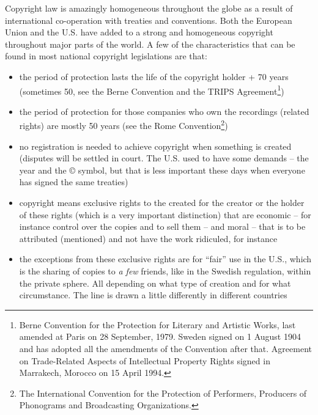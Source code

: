 Copyright law is amazingly homogeneous throughout the globe as a result of
international co-operation with treaties and conventions. Both the European
Union and the U.S. have added to a strong and homogeneous copyright throughout
major parts of the world. A few of the characteristics that can be found in most
national copyright legislations are that:
\begin{itemize}
    \item{the period of protection lasts the life of the copyright holder + 70
        years (sometimes 50, see the Berne Convention and the TRIPS
        Agreement\footnote{Berne Convention for the Protection for Literary and
        Artistic Works, last amended at Paris on 28 September, 1979. Sweden
        signed on 1 August 1904 and has adopted all the amendments of the
        Convention after that. Agreement on Trade-Related Aspects of
        Intellectual Property Rights signed in Marrakech, Morocco on 15 April
        1994.})}
    \item{the period of protection for those companies who own the recordings
        (related rights) are mostly 50 years (see the Rome
        Convention\footnote{The International Convention for the Protection of
        Performers, Producers of Phonograms and Broadcasting Organizations.})}
    \item{no registration is needed to achieve copyright when something is
        created (disputes will be settled in court. The U.S. used to have some
        demands – the year and the \copyright{} symbol, but that is less
        important these days when everyone has signed the same treaties)}
    \item{copyright means exclusive rights to the created for the creator or the
        holder of these rights (which is a very important distinction) that are
        economic – for instance control over the copies and to sell them – and
        moral – that is to be attributed (mentioned) and not have the work
        ridiculed, for instance}
    \item{the exceptions from these exclusive rights are for ``fair'' use in the
        U.S., which is the sharing of copies to \textit{a few} friends, like in
        the Swedish regulation, within the private sphere. All depending on what
        type of creation and for what circumstance. The line is drawn a little
        dif\hbox{}ferently in dif\hbox{}ferent countries}
\end{itemize}

